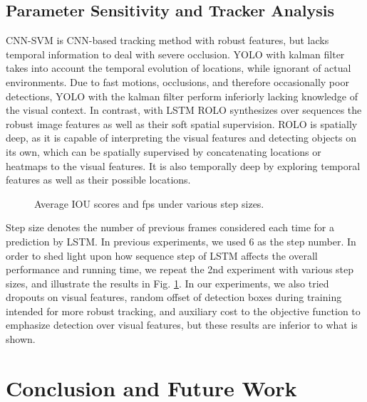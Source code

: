 \documentclass{article}
\begin{document}
\subsection{Parameter Sensitivity and Tracker Analysis}
CNN-SVM is CNN-based tracking method with robust features, but lacks temporal information to deal with severe occlusion. 
YOLO with kalman filter takes into account the temporal evolution of locations, while ignorant of actual environments. Due to fast motions, occlusions, and therefore occasionally poor detections, YOLO with the kalman filter perform inferiorly lacking knowledge of the visual context.
In contrast, with LSTM ROLO synthesizes over sequences the robust image features as well as their soft spatial supervision.  
ROLO is spatially deep, as it is capable of interpreting the visual features and detecting objects on its own, which can be spatially supervised by concatenating locations or heatmaps to the visual features. It is also temporally deep by exploring temporal features as well as their possible locations. 
\begin{figure}[!ht]
	\centering
	\caption{Average IOU scores and fps under various step sizes.}
	\label{fig-steps}
\end{figure}
Step size
denotes the number of previous frames considered each time for a prediction by LSTM. In previous experiments, we used 6 as the step number. 
In order to shed light upon how sequence step of LSTM affects the overall performance and running time, we repeat the 2nd experiment with various step sizes, and illustrate the results in Fig. \ref{fig-steps}. 
In our experiments, we also tried dropouts on visual features, random offset of detection boxes during training intended for more robust tracking, and auxiliary cost to the objective function to emphasize detection over visual features, but these results are inferior to what is shown.

\section{Conclusion and Future Work}
\end{document}
